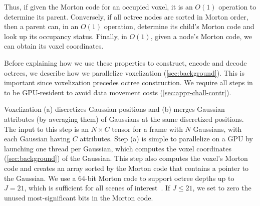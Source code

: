 
Thus, if given the Morton code for an occupied voxel, it is an $O(1)$ operation to determine its parent.
%
Conversely, if all octree nodes are sorted in Morton order, then a parent can, in an $O(1)$ operation, determine its child's Morton code and look up its occupancy status.
%
Finally, in $O(1)$, given a node's Morton code, we can obtain its voxel coordinates.

Before explaining how we use these properties to construct, encode and decode octrees, we describe how we parallelize voxelization (\cref{sec:background}).
%
This is important since voxelization precedes octree construction.
%
We require all steps in \gsnfs{} to be GPU-resident to avoid data movement costs (\cref{sec:appr-chall-contr}).

%
Voxelization (a) discretizes Gaussian positions and (b) merges Gaussian attributes (by averaging them) of Gaussians at the same discretized positions.
%
The input to this step is an $N \times C$ tensor for a \gs{} frame with $N$ Gaussians, with each Gaussian having $C$ attributes.
%
Step (a) is simple to parallelize on a GPU by launching one thread per Gaussian, which computes the voxel coordinates (\cref{sec:background}) of the Gaussian.
%
This step also computes the voxel's Morton code and creates an array sorted by the Morton code that contains a pointer to the Gaussian.
%
We use a 64-bit Morton code to support octree depths up to $J=21$, which is sufficient for all scenes of interest~\cite{mesongs}.
%
If $J\leq 21$, we set to zero the unused most-significant bits in the Morton code.

